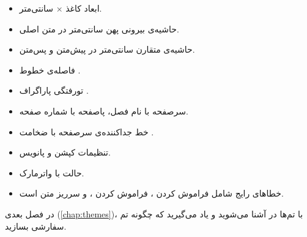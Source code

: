 \begin{itemize}
    \item ابعاد کاغذ  ×
     سانتی‌متر.

    \item حاشیه‌ی بیرونی پهن 
    سانتی‌متر در متن اصلی.

    \item حاشیه‌ی متقارن  سانتی‌متر
    در پیش‌متن و پس‌متن.

    \item فاصله‌ی خطوط .

    \item تورفتگی پاراگراف \pnum{۱em}.

    \item سرصفحه با نام فصل، پاصفحه با شماره
    صفحه.

    \item خط جداکننده‌ی سرصفحه با ضخامت
    \pnum{۰.۴pt}.

    \item تنظیمات کپشن و پانویس.

    \item حالت  با واترمارک.

    \item خطاهای رایج شامل فراموش کردن
    ، فراموش کردن
    ، و سرریز متن
    است.
\end{itemize}

در فصل بعدی (\cref{chap:themes})، با تم‌ها
در  آشنا می‌شوید و یاد
می‌گیرید که چگونه تم سفارشی بسازید.